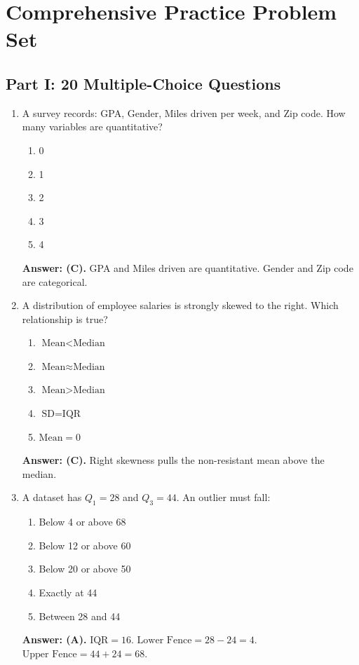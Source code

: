 \section{Comprehensive Practice Problem Set}

\subsection*{Part I: 20 Multiple-Choice Questions}

\begin{enumerate}[leftmargin=1.5em]
  \item A survey records: GPA, Gender, Miles driven per week, and Zip code. How many variables are quantitative?
  \begin{enumerate}[label=(\Alph*)]
    \item 0 \item 1 \item 2 \item 3 \item 4
  \end{enumerate}
  \textbf{Answer: (C).} GPA and Miles driven are quantitative. Gender and Zip code are categorical.

  \item A distribution of employee salaries is strongly skewed to the right. Which relationship is true?
  \begin{enumerate}[label=(\Alph*)]
    \item $\text{Mean} < \text{Median}$ \item $\text{Mean} \approx \text{Median}$ \item $\text{Mean} > \text{Median}$ \item $\text{SD} = \text{IQR}$ \item $\text{Mean} = 0$
  \end{enumerate}
  \textbf{Answer: (C).} Right skewness pulls the non-resistant mean above the median.

  \item A dataset has $Q_1 = 28$ and $Q_3 = 44$. An outlier must fall:
  \begin{enumerate}[label=(\Alph*)]
    \item Below 4 or above 68 \item Below 12 or above 60 \item Below 20 or above 50 \item Exactly at 44 \item Between 28 and 44
  \end{enumerate}
  \textbf{Answer: (A).} $\text{IQR} = 16$. $\text{Lower Fence} = 28 - 24 = 4$. $\text{Upper Fence} = 44 + 24 = 68$.


\end{enumerate}
